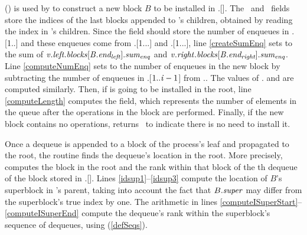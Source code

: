() is used
by  to construct a new block $B$ to be installed in .[].
The \eleft\ and \eright\ fields store the indices of the last blocks appended to 's
children, obtained by reading the  index in 's children.
Since the  field should store the number of enqueues in
.[1..] and these enqueues come from .[1...\eleft] and .[1...\eright], line \ref{createSumEnq} sets
 to the sum of $\mbox{\textnormal{\textit{v}}}.\mbox{\textit{left.blocks}}[\mbox{\textnormal{\textit{B}}}.\mbox{\textit{end\textsubscript{left}}}].\mbox{\textit{sum\textsubscript{enq}}}$ and $\mbox{\textnormal{\textit{v}}}.\mbox{\textit{right}}.\mbox{\textit{blocks}}[\mbox{\textnormal{\textit{B}}}.\mbox{\textit{end\textsubscript{right}}}].\mbox{\textit{sum\textsubscript{enq}}}$.
Line \ref{computeNumEnq} sets  to the number of enqueues in the new block by
subtracting  the number of enqueues  in .[$1..\mbox{\textnormal{\textit{i}}}-1$] from ..
The values of . and  are computed similarly.
Then, if 
is going to be installed in the root, line \ref{computeLength} computes the  field, which
represents the number of elements in the queue after the operations in the block are performed.
Finally, if the new block contains no operations,  returns \nl\ to indicate
 there is no need to install it.

Once a dequeue is appended to a block of the process's leaf and propagated to the root,
the  routine finds the dequeue's location in the root.
More precisely, 
computes the block in the root and the rank
within that block  of the th dequeue of the block  stored in .[].
Lines \ref{idsup1}--\ref{idsup3} compute the location of $B$'s superblock in 's parent, taking into account the fact that $B.\mbox{\textit{super}}$ may differ from the superblock's true index by one.
The arithmetic in lines \ref{computeISuperStart}--\ref{computeISuperEnd} compute the dequeue's 
rank within the superblock's sequence of dequeues, using  (\ref{defSeqs}).


